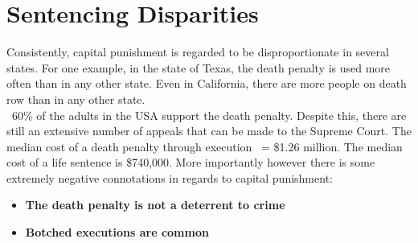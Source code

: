 \documentclass[10pt]{article}
\begin{document}
\section*{Sentencing Disparities}
Consistently, capital punishment is regarded to be disproportionate in several states. For one example, in the state of Texas, the death penalty is used more often than in any other state. Even in California, there are more people on death row than in any other state.\\
~60\% of the adults in the USA support the death penalty. Despite this, there are still an extensive number of appeals that can be made to the Supreme Court. The median cost of a death penalty through execution ~= \$1.26 million. The median cost of a life sentence is \$740,000. More importantly however there is some extremely negative connotations in regards to capital punishment:\\
\begin{itemize}
    \item \textbf{The death penalty is not a deterrent to crime}
    \item \textbf{Botched executions are common}
\end{itemize}
\end{document}

